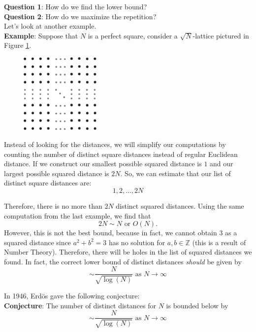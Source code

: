 \documentclass[12pt]{article}
\begin{document}
\noindent \textbf{Question 1}: How do we find the lower bound? \\
\noindent \textbf{Question 2}: How do we maximize the repetition? \\

\noindent Let's look at another example. \\

\noindent \textbf{Example}: Suppose that $N$ is a perfect square, consider a $\sqrt{N}$-lattice pictured in Figure \ref{lattice}. 

\begin{figure}[H]
\centering
\includegraphics[width=0.35\textwidth]{1SquareLattice.pdf}
\caption{}
\label{lattice}
\end{figure}

\noindent Instead of looking for the distances, we will simplify our computations by counting the number of distinct square distances instead of regular Euclidean distance. If we construct our smallest possible squared distance is $1$ and our largest possible squared distance is $2N$. So, we can estimate that our list of distinct square distances are:
$$1, 2, \dots, 2N$$

\noindent Therefore, there is no more than $2N$ distinct squared distances. Using the same computation from the last example, we find that 
$$2N \sim N \text{ or } O(N).$$
However, this is not the best bound, because in fact, we cannot obtain 3 as a squared distance since $a^2+b^2=3$ has no solution for $a,b \in \mathbb{Z}$ (this is a result of Number Theory). Therefore, there will be holes in the list of squared distances we found. In fact, the correct lower bound of distinct distances \textit{should} be given by
$$\sim \frac{N}{\sqrt{\log(N)}} \text{ as } N \rightarrow \infty$$

\noindent In 1946, Erd\"os gave the following conjecture: \\

\noindent \textbf{Conjecture}: The number of distinct distances for $N$ is bounded below by 
$$\sim \frac{N}{\sqrt{\log(N)}} \text{ as } N \rightarrow \infty$$
\end{document}
